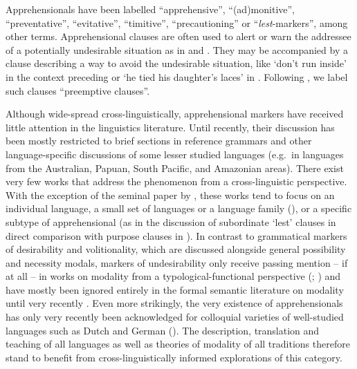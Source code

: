 \documentclass[output=paper,colorlinks,citecolor=brown
]{langscibook}
\begin{document}
Apprehensionals have been labelled ``apprehensive'', ``(ad)monitive'', ``preventative'', ``evitative'', ``timitive'', ``precautioning'' or ``\textit{lest}-markers'', among other terms. Apprehensional clauses are often used to alert or warn the addressee of a potentially undesirable situation as in  and . They may be accompanied by a clause describing a way to avoid the undesirable situation, like `don't run inside' in the context preceding  or `he tied his daughter's laces' in . Following \citet[265]{evans1995}, we label such clauses ``preemptive clauses''.
 
Although wide-spread cross-linguistically, apprehensional markers have received little attention in the linguistics literature. Until recently, their discussion has been mostly restricted to brief sections in reference grammars and other language-specific discussions of some lesser studied languages (e.g.\ in languages from the Australian, Papuan, South Pacific, and Amazonian areas). There exist very few works that address the phenomenon from a cross-linguistic perspective. With the exception of the seminal paper by \citet{Dobrushina2006}, these works tend to focus on an individual language, a small set of languages or a language family (\cite{lichtenberk1995,pakendorfschalley2007,vuillermet2018a}), or a specific subtype of apprehensional (as in the discussion of subordinate `lest' clauses in direct comparison with purpose clauses in \cite[129--144]{schmidtkebode2009}). In contrast to grammatical markers of desirability and volitionality, which are discussed alongside general possibility and necessity modals, markers of undesirability only receive passing mention -- if at all -- in works on modality from a typological-functional perspective (\cite[211]{bybeeetal1994}; \cite[22]{palmer2001}) and have mostly been ignored entirely in the formal semantic literature on modality until very recently \citep{anderbois2020salt,phillips2021,tahar2021, dabkowskianderbois2023}. Even more strikingly, the very existence of apprehensionals has only very recently been acknowledged for colloquial varieties of well-studied languages such as Dutch \citep{boogaart2009,boogaart2020} and German (\cite{angeloschultzeberndt2018,fallerschultzeberndt2018,fenkoczlon2018}). The description, translation and teaching of all languages as well as theories of modality of all traditions therefore stand to benefit from cross-linguistically informed explorations of this category.
\end{document}
